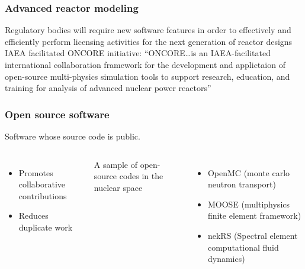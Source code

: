 \begin{frame}
    \frametitle{Advanced reactor modeling}
    Regulatory bodies will require new software features in order to effectively and efficiently perform licensing activities for the next generation of reactor designs\cite{usnrc_nonlwr_2020-1}
    \pause
    \newline
    \newline
    \Gls{IAEA} facilitated \Gls{ONCORE} initiative\cite{fiorina_initiative_2021}:
    \newline
    \newline
    \noindent ``ONCORE\ldots is an IAEA-facilitated international collaboration framework for the development and applictaion of open-source multi-physics simulation tools to support research, education, and training for analysis of advanced nuclear power reactors''\cite{iaea_open-source}
\end{frame}

\begin{frame}
    \frametitle{Open source software}
    Software whose source code is public.
    
    \begin{columns}
        \column[t]{5cm}
        \begin{itemize}
            \item Promotes collaborative contributions
            \item Reduces duplicate work
        \end{itemize}

        \pause
        \column[t]{5cm}
        A sample of open-source codes in the nuclear space
        \begin{itemize}
            \item OpenMC (monte carlo neutron transport)
            \item MOOSE (multiphysics finite element framework)
            \item nekRS (Spectral element computational fluid dynamics)
        \end{itemize}
    \end{columns}
\end{frame}

